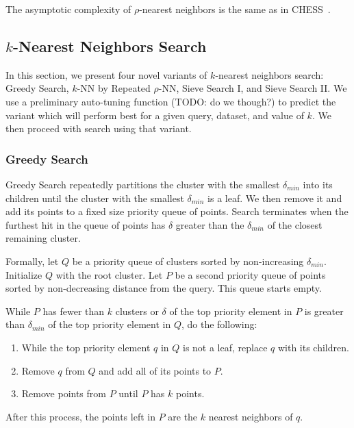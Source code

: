 The asymptotic complexity of $\rho$-nearest neighbors is the same as in CHESS~\cite{ishaq2019clustered}.

\subsection{\texorpdfstring{$k$}{k}-Nearest Neighbors Search}
\label{subsec:methods:knn-search}

In this section, we present four novel variants of $k$-nearest neighbors search: Greedy Search, $k$-NN by Repeated $\rho$-NN, Sieve Search I, and Sieve Search II. 
We use a preliminary auto-tuning function (TODO: do we though?) to predict the variant which will perform 
best for a given query, dataset, and value of $k$. We then proceed with search using that variant.  

\subsubsection{Greedy Search}
\label{subsubsec:methods:knn-search:greedy-search}
Greedy Search repeatedly partitions the cluster with the smallest $\delta_{min}$ into its children 
until the cluster with the smallest $\delta_{min}$ is a leaf. We then remove it and add its points to a fixed size priority queue of points. 
Search terminates when the furthest hit in the queue of points has $\delta$ greater than the $\delta_{min}$ of the closest remaining cluster.

Formally, let $Q$ be a priority queue of clusters sorted by non-increasing $\delta_{min}$. Initialize $Q$ with the root cluster.
Let $P$ be a second priority queue of points sorted by non-decreasing distance from the query. This queue starts empty.

While $P$ has fewer than $k$ clusters or $\delta$ of the top priority element in $P$ is greater 
than $\delta_{min}$ of the top priority element in $Q$, do the following:
\begin{enumerate}
\item While the top priority element $q$ in $Q$ is not a leaf, replace $q$ with its children.
\item Remove $q$ from $Q$ and add all of its points to $P$. 
\item Remove points from $P$ until $P$ has $k$ points. 
\end{enumerate}
After this process, the points left in $P$ are the $k$ nearest neighbors of $q$.

